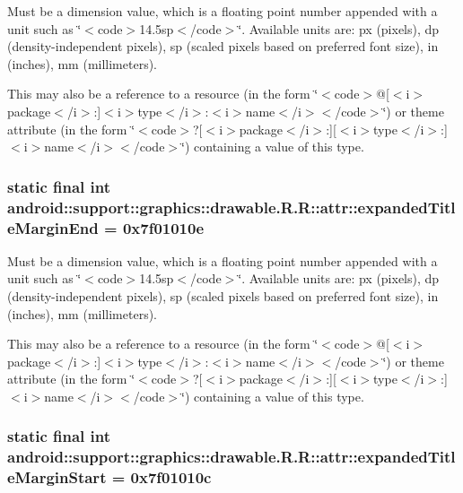 Must be a dimension value, which is a floating point number appended with a unit such as \char`\"{}$<$code$>$14.5sp$<$/code$>$\char`\"{}. Available units are: px (pixels), dp (density-independent pixels), sp (scaled pixels based on preferred font size), in (inches), mm (millimeters). 

This may also be a reference to a resource (in the form \char`\"{}$<$code$>$@\mbox{[}$<$i$>$package$<$/i$>$:\mbox{]}$<$i$>$type$<$/i$>$:$<$i$>$name$<$/i$>$$<$/code$>$\char`\"{}) or theme attribute (in the form \char`\"{}$<$code$>$?\mbox{[}$<$i$>$package$<$/i$>$:\mbox{]}\mbox{[}$<$i$>$type$<$/i$>$:\mbox{]}$<$i$>$name$<$/i$>$$<$/code$>$\char`\"{}) containing a value of this type. \hypertarget{classandroid_1_1support_1_1graphics_1_1drawable_1_1_r_1_1attr_c7bac2748754438543f42292399d9271}{
\subsubsection[{expandedTitleMarginEnd}]{\setlength{\rightskip}{0pt plus 5cm}static final int android::support::graphics::drawable.R.R::attr::expandedTitleMarginEnd = 0x7f01010e}}
\label{classandroid_1_1support_1_1graphics_1_1drawable_1_1_r_1_1attr_c7bac2748754438543f42292399d9271}


Must be a dimension value, which is a floating point number appended with a unit such as \char`\"{}$<$code$>$14.5sp$<$/code$>$\char`\"{}. Available units are: px (pixels), dp (density-independent pixels), sp (scaled pixels based on preferred font size), in (inches), mm (millimeters). 

This may also be a reference to a resource (in the form \char`\"{}$<$code$>$@\mbox{[}$<$i$>$package$<$/i$>$:\mbox{]}$<$i$>$type$<$/i$>$:$<$i$>$name$<$/i$>$$<$/code$>$\char`\"{}) or theme attribute (in the form \char`\"{}$<$code$>$?\mbox{[}$<$i$>$package$<$/i$>$:\mbox{]}\mbox{[}$<$i$>$type$<$/i$>$:\mbox{]}$<$i$>$name$<$/i$>$$<$/code$>$\char`\"{}) containing a value of this type. \hypertarget{classandroid_1_1support_1_1graphics_1_1drawable_1_1_r_1_1attr_60dfc33179b494fa82f9daa590771ff7}{
\subsubsection[{expandedTitleMarginStart}]{\setlength{\rightskip}{0pt plus 5cm}static final int android::support::graphics::drawable.R.R::attr::expandedTitleMarginStart = 0x7f01010c}}
\label{classandroid_1_1support_1_1graphics_1_1drawable_1_1_r_1_1attr_60dfc33179b494fa82f9daa590771ff7}


